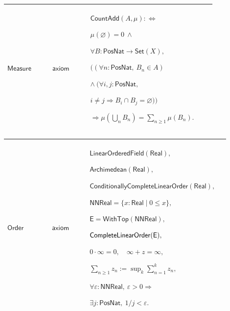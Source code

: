 \documentclass[12pt,reqno]{amsart}
\theoremstyle{blueplain}
\numberwithin{equation}{section}
\begin{document}
{\scriptsize \setlength{\parskip}{0pt}\nointerlineskip
\noindent 
\begin{tabular}{|@{}>{\centering\arraybackslash}m{0.19251\linewidth}|>{\centering\arraybackslash}m{0.16845\linewidth}|>{\centering\arraybackslash}m{0.53904\linewidth}|}
\hline
\hypertarget{ax:Measure}{$\displaystyle \mathsf{Measure}$} & $\displaystyle 
\mathsf{axiom}$ & $\displaystyle \mathsf{CountAdd}(A,\mu):%
\Longleftrightarrow $\par$\displaystyle \mu(\varnothing)=0\ \land$\par$%
\displaystyle \forall B:\mathsf{PosNat}\to\mathsf{Set}(X),$\par$%
\displaystyle \bigl((\forall n:\mathsf{PosNat},\ B_n\in A)$\par$%
\displaystyle \land\ (\forall i,j:\mathsf{PosNat},$\par$\displaystyle i\ne
j\Rightarrow B_i\cap B_j=\varnothing)\bigr)$\par$\displaystyle %
\Rightarrow\mu(\bigcup_n B_n)=\sum_{n\ge1}\mu(B_n).$ \\ \hline
\end{tabular}%
}

{\scriptsize \setlength{\parskip}{0pt}\nointerlineskip
\noindent 
\begin{tabular}{|@{}>{\centering\arraybackslash}m{0.19251\linewidth}|>{\centering\arraybackslash}m{0.16845\linewidth}|>{\centering\arraybackslash}m{0.53904\linewidth}|}
\hline
\hypertarget{ax:Order}{$\displaystyle \mathsf{Order}$} & $\displaystyle 
\mathsf{axiom}$ & $\displaystyle \mathsf{LinearOrderedField}(\mathsf{Real}),$%
\par$\displaystyle \mathsf{Archimedean}(\mathsf{Real}),$\par$\displaystyle 
\mathsf{ConditionallyCompleteLinearOrder}(\mathsf{Real}),$\par$\displaystyle 
\mathsf{NNReal}=\{x:\mathsf{Real}\mid0\le x\},$\par$\displaystyle \mathsf{E}=%
\mathsf{WithTop}(\mathsf{NNReal}),$\par$\displaystyle \mathsf{%
CompleteLinearOrder}(\mathsf{E}),$\par$\displaystyle 0\cdot\infty=0,\quad%
\infty+z=\infty,$\par$\displaystyle \sum_{n\ge1}z_n:=\sup_k\sum_{n=1}^kz_n,$%
\par$\displaystyle \forall\varepsilon:\mathsf{NNReal},\
\varepsilon>0\Rightarrow$\par$\displaystyle \exists j:\mathsf{PosNat},\
1/j<\varepsilon.$ \\ \hline
\end{tabular}%
}
\end{document}
